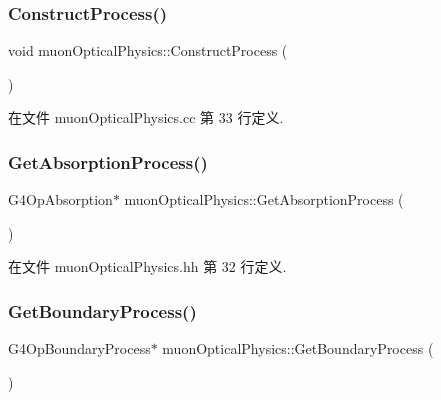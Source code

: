 \subsubsection{\texorpdfstring{Construct\+Process()}{ConstructProcess()}}
{\footnotesize\ttfamily void muon\+Optical\+Physics\+::\+Construct\+Process (\begin{DoxyParamCaption}{ }\end{DoxyParamCaption})\hspace{0.3cm}{\ttfamily [virtual]}}



在文件 muon\+Optical\+Physics.\+cc 第 33 行定义.

\mbox{\label{classmuonOpticalPhysics_a0e66d292a9509fdc6703fcdea0e38c7d}} 
\subsubsection{\texorpdfstring{Get\+Absorption\+Process()}{GetAbsorptionProcess()}}
{\footnotesize\ttfamily G4\+Op\+Absorption$\ast$ muon\+Optical\+Physics\+::\+Get\+Absorption\+Process (\begin{DoxyParamCaption}{ }\end{DoxyParamCaption})\hspace{0.3cm}{\ttfamily [inline]}}



在文件 muon\+Optical\+Physics.\+hh 第 32 行定义.

\mbox{\label{classmuonOpticalPhysics_ad1abfb3c7d0cea07d456c5651390b168}} 
\subsubsection{\texorpdfstring{Get\+Boundary\+Process()}{GetBoundaryProcess()}}
{\footnotesize\ttfamily G4\+Op\+Boundary\+Process$\ast$ muon\+Optical\+Physics\+::\+Get\+Boundary\+Process (\begin{DoxyParamCaption}{ }\end{DoxyParamCaption})\hspace{0.3cm}{\ttfamily [inline]}}



